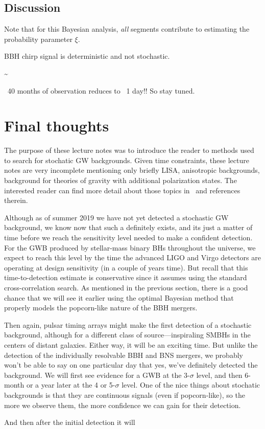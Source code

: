 \subsection{Discussion}

Note that for this Bayesian analysis, {\em all} segments contribute
to estimating the probability parameter $\xi$.

BBH chirp signal is deterministic and not stochastic.

\be
{}\sim {}
\ee

~40 months of observation reduces to ~1 day!!
So stay tuned.

\section{Final thoughts}

The purpose of these lecture notes was to introduce the reader to
methods used to search for stochatic GW backgrounds.
Given time constraints, these lecture notes are very incomplete
mentioning only briefly LISA, anisotropic backgrounds,
background for theories of gravity with additional polarization
states.
The interested reader can find more detail about those topics
in~\cite{Romano-Cornish:2017} and references therein.

Although as of summer 2019 we have not yet detected a stochastic
GW background, we know now that such a definitely exists, 
and its just a matter of time 
before we reach the sensitivity level needed to make a confident 
detection.
For the GWB produced by stellar-mass binary BHs throughout 
the universe, we expect to reach this level
by the time the advanced LIGO and Virgo detectors are operating
at design sensitivity (in a couple of years time).
But recall that this time-to-detection estimate is 
conservative since it 
assumes using the standard cross-correlation search.
As mentioned in the previous section, there is a good 
chance that we will see it earlier using the optimal Bayesian
method that properly models the popcorn-like nature of the
BBH mergers.

Then again, pulsar timing arrays might make the first detection 
of a stochastic background, although for a different class of
source---inspiraling SMBHs in the centers of distant galaxies.
Either way, it will be an exciting time.
But unlike the detection of the individually resolvable
BBH and BNS mergers, we probably
won't be able to say on one particular day that yes, we've 
definitely detected the background.
We will first see evidence for a GWB at the 3-$\sigma$ level,
and then 6-month or a year later at the 4 or 5-$\sigma$ level.
One of the nice things about stochatic backgrounds is that
they are continuous signals (even if popcorn-like), so the
more we observe them, the more confidence we can gain
for their detection.

And then after the initial detection it will
 
